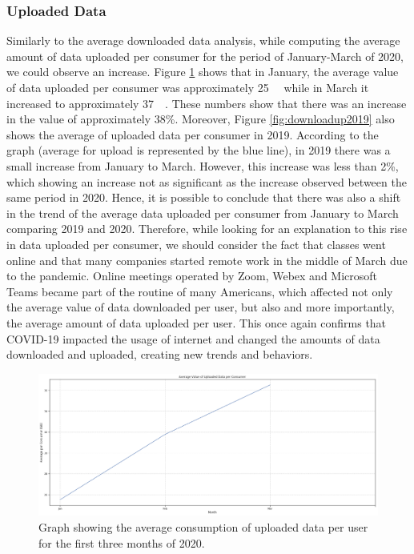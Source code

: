 \documentclass[conference,10pt]{IEEEtran}
\begin{document}
\subsubsection{Uploaded Data}
\label{sec:upload-data-consumption}

Similarly to the average downloaded data analysis, while computing the average amount of data uploaded per consumer for the period of January-March of 2020, we could observe an increase. Figure \ref{fig:upload2020} shows that in January, the average value of data uploaded per consumer was approximately \SI{25}{\giga\byte} while in March it increased to approximately \SI{37}{\giga\byte}. These numbers show that there was an increase in the value of approximately 38\%. Moreover, Figure \ref{fig:downloadup2019} also shows the average of uploaded data per consumer in 2019. According to the graph (average for upload is represented by the blue line), in 2019 there was a small increase from January to March. However, this increase was less than 2\%, which showing an increase not as significant as the increase observed between the same period in 2020. Hence, it is possible to conclude that there was also a shift in the trend of the average data uploaded per consumer from January to March comparing 2019 and 2020. Therefore, while looking for an explanation to this rise in data uploaded per consumer, we should consider the fact that classes went online and that many companies started remote work in the middle of March due to the pandemic. Online meetings operated by Zoom, Webex and Microsoft Teams became part of the routine of many Americans, which affected not only the average value of data downloaded per user, but also and more importantly, the average amount of data uploaded per user. This once again confirms that COVID-19 impacted the usage of internet and changed the amounts of data downloaded and uploaded, creating new trends and behaviors. 

\begin{figure}
\centering
\includegraphics[width=1.0\linewidth]{figs/upload2020.PNG}
\caption{Graph showing the average consumption of uploaded data per user for the first three months of 2020.}
\label{fig:upload2020}
\end{figure}
\end{document}
